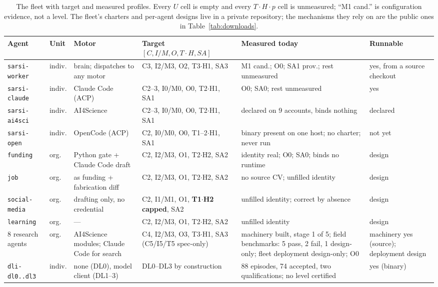 \documentclass[11pt]{article}
\theoremstyle{definition}
\begin{document}
\begin{table}[H]
\centering\footnotesize
\begin{tabularx}{\textwidth}{@{}p{2.1cm}p{0.9cm}YYYp{1.7cm}@{}}
\toprule
Agent & Unit & Motor & Target $[C, I/M, O, T{\cdot}H, SA]$ & Measured today & Runnable \\
\midrule
\texttt{sarsi-worker} & indiv. & brain; dispatches to any motor & C3, I2/M3, O2, T3$\cdot$H1, SA3 & M1 cand.; O0; SA1 prov.; rest unmeasured & yes, from a source checkout \\
\texttt{sarsi-claude} & indiv. & Claude Code (ACP) & C2--3, I0/M0, O0, T2$\cdot$H1, SA1 & O0; SA0; rest unmeasured & yes \\
\texttt{sarsi-ai4sci} & indiv. & AI4Science & C2--3, I0/M0, O0, T2$\cdot$H1, SA1 & declared on 9 accounts, binds nothing & declared \\
\texttt{sarsi-open} & indiv. & OpenCode (ACP) & C2, I0/M0, O0, T1--2$\cdot$H1, SA1 & binary present on one host; no charter; never run & not yet \\
\texttt{funding} & org. & Python gate + Claude Code draft & C2, I2/M3, O1, T2$\cdot$H2, SA2 & identity real; O0; SA0; binds no runtime & design \\
\texttt{job} & org. & as funding + fabrication diff & C2, I2/M3, O1, T2$\cdot$H2, SA2 & no source CV; unfilled identity & design \\
\texttt{social-media} & org. & drafting only, no credential & C2, I1/M1, O1, \textbf{T1$\cdot$H2 capped}, SA2 & unfilled identity; correct by absence & design \\
\texttt{learning} & org. & --- & C2, I2/M3, O1, T2$\cdot$H2, SA2 & unfilled identity & design \\
8 research agents & org. & AI4Science modules; Claude Code for search & C4, I2/M3, O3, T3$\cdot$H1, SA3 (C5/I5/T5 spec-only) & machinery built, stage 1 of 5; field benchmarks: 5 pass, 2 fail, 1 design-only; fleet deployment design-only; O0 & machinery yes (source); deployment design \\
\texttt{dli-dl0..dl3} & indiv. & none (DL0), model client (DL1--3) & DL0--DL3 by construction & 88 episodes, 74 accepted, two qualifications; no level certified & yes (binary) \\
\bottomrule
\end{tabularx}
\caption{The fleet with target and measured profiles. Every $U$ cell is empty and every $T{\cdot}H{\cdot}p$ cell is unmeasured; ``M1 cand.'' is configuration evidence, not a level. The fleet's charters and per-agent designs live in a private repository; the mechanisms they rely on are the public ones in Table~\ref{tab:downloads}.}
\label{tab:fleet}
\end{table}
\end{document}

